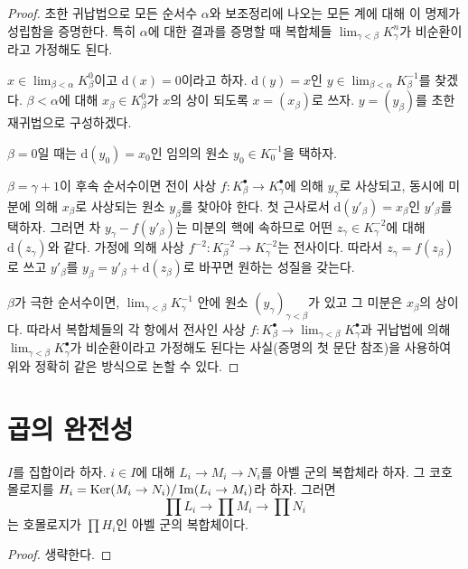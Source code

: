 \begin{proof}
초한 귀납법으로 모든 순서수 $\alpha$와 보조정리에 나오는 모든 계에
대해 이 명제가 성립함을 증명한다. 특히 $\alpha$에 대한 결과를 증명할
때 복합체들 $\lim_{\gamma < \beta} K^n_\gamma$가 비순환이라고 가정해도
된다.

\medskip\noindent
$x \in \lim_{\beta < \alpha} K^0_\beta$이고 $\text{d}(x) = 0$이라고 하자.
$\text{d}(y) = x$인 $y \in \lim_{\beta < \alpha} K^{-1}_\beta$를 찾겠다.
$\beta < \alpha$에 대해 $x_\beta \in K_\beta^0$가 $x$의 상이 되도록
$x = (x_\beta)$로 쓰자. $y = (y_\beta)$를 초한 재귀법으로 구성하겠다.

\medskip\noindent
$\beta = 0$일 때는 $\text{d}(y_0) = x_0$인 임의의 원소
$y_0 \in K_0^{-1}$을 택하자.

\medskip\noindent
$\beta = \gamma + 1$이 후속 순서수이면 전이 사상
$f : K^\bullet_\beta \to K^\bullet_\gamma$에 의해 $y_\gamma$로 사상되고,
동시에 미분에 의해 $x_\beta$로 사상되는 원소 $y_\beta$를 찾아야 한다.
첫 근사로서 $\text{d}(y'_\beta) = x_\beta$인 $y'_\beta$를 택하자.
그러면 차 $y_\gamma - f(y'_\beta)$는 미분의 핵에 속하므로 어떤
$z_\gamma \in K^{-2}_\gamma$에 대해 $\text{d}(z_\gamma)$와 같다.
가정에 의해 사상 $f^{-2} : K^{-2}_\beta \to K^{-2}_\gamma$는 전사이다.
따라서 $z_\gamma = f(z_\beta)$로 쓰고 $y'_\beta$를
$y_\beta = y'_\beta + \text{d}(z_\beta)$로 바꾸면 원하는 성질을 갖는다.

\medskip\noindent
$\beta$가 극한 순서수이면, $\lim_{\gamma < \beta} K^{-1}_\gamma$ 안에
원소 $(y_\gamma)_{\gamma < \beta}$가 있고 그 미분은 $x_\beta$의 상이다.
따라서 복합체들의 각 항에서 전사인 사상
$f : K_\beta^\bullet \to \lim_{\gamma < \beta} K_\gamma^\bullet$과
귀납법에 의해 $\lim_{\gamma < \beta} K_\gamma^\bullet$가 비순환이라고
가정해도 된다는 사실(증명의 첫 문단 참조)을 사용하여 위와 정확히 같은
방식으로 논할 수 있다.
\end{proof}



\section{곱의 완전성}
\label{section-product-exact}


\begin{lemma}
\label{lemma-product-abelian-groups-exact}
$I$를 집합이라 하자. $i \in I$에 대해 $L_i \to M_i \to N_i$를
아벨 군의 복합체라 하자. 그 코호몰로지를
$H_i = \mathop{\mathrm{Ker}}(M_i \to N_i)/\mathop{\mathrm{Im}}(L_i \to M_i)$라 하자. 그러면
$$
\prod L_i \to \prod M_i \to \prod N_i
$$
는 호몰로지가 $\prod H_i$인 아벨 군의 복합체이다.
\end{lemma}

\begin{proof}
생략한다.
\end{proof}












